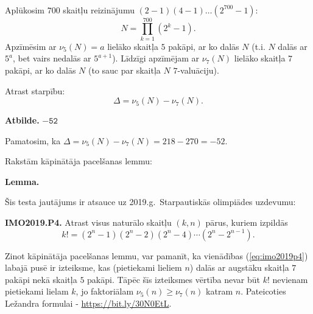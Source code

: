 \documentclass[a4paper,12pt]{article}
\begin{document}
\vspace{10pt}
\begin{problem}
\mbox{}\\



Aplūkosim $700$ skaitļu reizinājumu $(2-1)(4-1)\ldots{}(2^{700} - 1)$:
\[ N = \prod\limits_{k=1}^{700} \left( 2^k - 1 \right). \]
Apzīmēsim ar $\nu_5(N) = a$ lielāko skaitļa $5$ pakāpi, ar ko dalās $N$
(t.i. $N$ dalās ar $5^{a}$, bet vairs nedalās ar $5^{a+1}$).
Līdzīgi apzīmējam ar $\nu_7(N)$ lielāko skaitļa $7$ pakāpi, ar ko dalās $N$
(to sauc par skaitļa $N$ $7$-valuāciju).

Atrast starpību:
\[ \Delta = \nu_5(N) - \nu_7(N). \]


\vspace{20pt}
{\bf Atbilde.} $\mathtt{-52}$

Pamatosim, ka $\Delta = \nu_5(N) - \nu_7(N) = 218 - 270 = -52$.

Rakstām kāpinātāja pacelšanas lemmu:

{\bf Lemma.}


Šis testa jautājums ir atsauce uz 2019.g.\ Starpautiskās olimpiādes uzdevumu:

{\bf IMO2019.P4.} Atrast visus naturālo skaitļu $(k,n)$ pārus, kuriem izpildās
\begin{equation}
\label{eq:imo2019p4}
k! = (2^n - 1)(2^n - 2)(2^n - 4) \cdots (2^n - 2^{n-1}).
\end{equation}

Zinot kāpinātāja pacelšanas lemmu, var pamanīt, ka vienādības (\ref{eq:imo2019p4}) labajā
pusē ir izteiksme, kas (pietiekami lieliem $n$) dalās ar augstāku skaitļa $7$ pakāpi
nekā skaitļa $5$ pakāpi. Tāpēc šīs izteiksmes vērtība nevar būt $k!$ nevienam
pietiekami lielam $k$, jo faktoriālam $\nu_5(n) \geq \nu_7(n)$ katram $n$.
Pateicoties Ležandra formulai - \url{https://bit.ly/30N0EtL}.

\end{problem}
\end{document}
